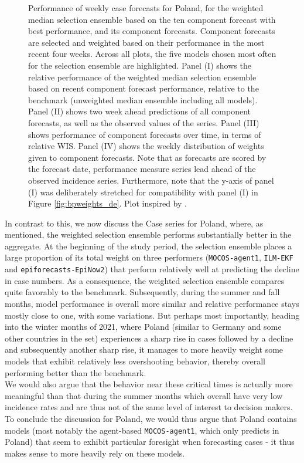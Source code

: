 \begin{figure}
\caption{\footnotesize{Performance of weekly case forecasts for Poland, for the weighted median selection ensemble based on the ten component forecast with best performance, and its component forecasts. Component forecasts are selected and weighted based on their performance in the most recent four weeks. Across all plots, the five models chosen most often for the selection ensemble are highlighted. Panel (I) shows the relative performance of the weighted median selection ensemble based on recent component forecast performance, relative to the benchmark (unweighted median ensemble including all models). Panel (II) shows two week ahead predictions of all component forecasts, as well as the observed values of the series. Panel (III) shows performance of component forecasts over time, in terms of relative WIS. Panel (IV) shows the weekly distribution of weights given to component forecasts. Note that as forecasts are scored by the forecast date, performance measure series lead ahead of the observed incidence series. Furthermore, note that the y-axis of panel (I) was deliberately stretched for compatibility with panel (I) in Figure \ref{fig:bpweights_de}. Plot inspired by \cite{ray_comparing_2022}.}}
\label{fig:bpweights_pl}
\end{figure}
In contrast to this, we now discuss the Case series for Poland, where, as mentioned, the weighted selection ensemble performs substantially better in the aggregate. At the beginning of the study period, the selection ensemble places a large proportion of its total weight on three performers (\texttt{MOCOS-agent1}, \texttt{ILM-EKF} and \texttt{epiforecasts-EpiNow2}) that perform relatively well at predicting the decline in case numbers. As a consequence, the weighted selection ensemble compares quite favorably to the benchmark. Subsequently, during the summer and fall months, model performance is overall more similar and relative performance stays mostly close to one, with some variations. %
But perhaps most importantly, heading into the winter months of 2021, where Poland (similar to Germany and some other countries in the set) experiences a sharp rise in cases followed by a decline and subsequently another sharp rise, it manages to more heavily weight some models that exhibit relatively less overshooting behavior, thereby overall performing better than the benchmark. \\We would also argue that the behavior near these critical times is actually more meaningful than that during the summer months which overall have very low incidence rates and are thus not of the same level of interest to decision makers. To conclude the discussion for Poland, we would thus argue that Poland contains models (most notably the agent-based \texttt{MOCOS-agent1}, which only predicts in Poland) that seem to exhibit particular foresight when forecasting cases - it thus makes sense to more heavily rely on these models. \\%
